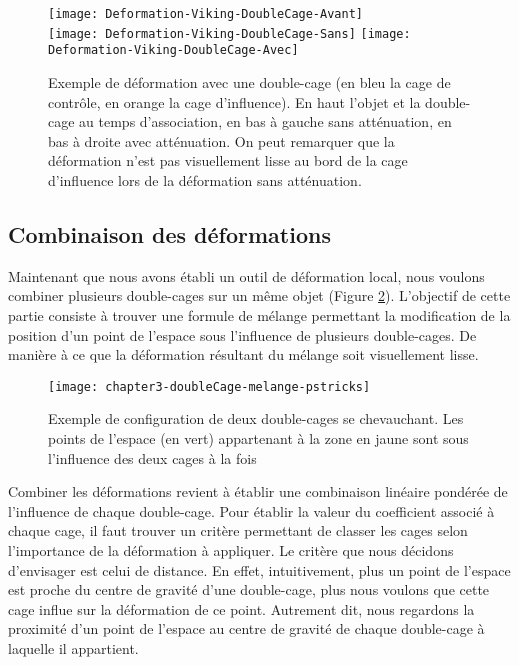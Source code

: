 \begin{figure}[!ht]
    \texttt{[image: Deformation-Viking-DoubleCage-Avant]}\\
    \texttt{[image: Deformation-Viking-DoubleCage-Sans]}
    \texttt{[image: Deformation-Viking-DoubleCage-Avec]}

    \caption[Exemple de déformation double-cage] {Exemple de déformation avec
une double-cage (en bleu la cage de contrôle, en orange la cage d'influence).
En haut l'objet et la double-cage au temps d'association, en bas à gauche
sans atténuation, en bas à droite avec atténuation. On peut
remarquer que la déformation n'est pas visuellement lisse au bord de la cage
d'influence lors de la déformation sans atténuation.}

  \label{MELDef1}

\end{figure}

\subsection{Combinaison des déformations}

Maintenant que nous avons établi un outil de déformation local, nous voulons
combiner plusieurs double-cages sur un même objet (Figure \ref{MELMC}).
L'objectif de cette partie consiste à trouver une formule de mélange
permettant la modification de la position d'un point de l'espace sous
l'influence de plusieurs double-cages. De manière à ce que la déformation
résultant du mélange soit visuellement lisse.

\begin{figure}[!ht]
    \texttt{[image: chapter3-doubleCage-melange-pstricks]}

    \caption[Mélange de double-cages] {Exemple de
configuration de deux double-cages se chevauchant. Les points
de l'espace (en vert) appartenant à la zone en jaune sont sous l'influence des
deux cages à la fois}

    \label{MELMC}
\end{figure}

Combiner les déformations revient à établir une combinaison linéaire pondérée
de l'influence de chaque double-cage. Pour établir la valeur du coefficient
associé à chaque cage, il faut trouver un critère permettant de classer les
cages selon l'importance de la déformation à appliquer. Le critère que nous
décidons d'envisager est celui de distance. En effet, intuitivement, plus un
point de l'espace est proche du centre de gravité d'une double-cage, plus nous
voulons que cette cage influe sur la déformation de ce point. Autrement dit,
nous regardons la proximité d'un point de l'espace au centre de gravité de
chaque double-cage à laquelle il appartient.

